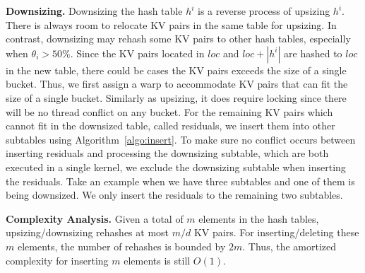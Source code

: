 \vspace{1mm}\noindent\textbf{Downsizing.}
Downsizing the hash table $h^i$ is a reverse process of upsizing $h^i$. There is always room to relocate KV pairs in the same table for upsizing. 
In contrast, downsizing may rehash some KV pairs to other hash tables, especially when $\theta_i > 50\%$.
Since the KV pairs located in $loc$ and $loc+|h^i|$ are hashed to $loc$ in the new table, there could be cases the KV pairs exceeds the size of a single bucket. 
Thus, we first assign a warp to accommodate KV pairs that can fit the size of a single bucket. Similarly as upsizing, it does require locking since there will be no thread conflict on any bucket. 
For the remaining KV pairs which cannot fit in the downsized table, called residuals, we insert them into other subtables using Algorithm~\ref{algo:insert}.
To make sure no conflict occurs between inserting residuals and processing the downsizing subtable, which are both executed in a single kernel, we exclude the downsizing subtable when inserting the residuals. 
Take an example when we have three subtables and one of them is being downsized. 
We only insert the residuals to the remaining two subtables. 



\vspace{1mm}\noindent\textbf{Complexity Analysis.}
Given a total of $m$ elements in the hash tables, upsizing/downsizing rehashes at most $m/d$ KV pairs. 
For inserting/deleting these $m$ elements, the number of rehashes is bounded by $2m$. 
Thus, the amortized complexity for inserting $m$ elements is still $O(1)$.
